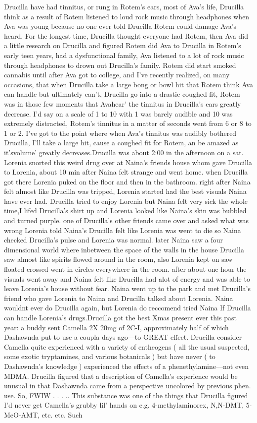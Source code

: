 \documentclass[12pt]{book}
\begin{document}
Drucilla have had tinnitus, or rung in Rotem's ears, most of Ava's life, Drucilla think as a result of Rotem listened to loud rock music through headphones when Ava was young because no one ever told Drucilla Rotem could damage Ava's heard. For the longest time, Drucilla thought everyone had Rotem, then Ava did a little research on Drucilla and figured Rotem did Ava to Drucilla in Rotem's early teen years, had a dysfunctional family, Ava listened to a lot of rock music through headphones to drown out Drucilla's family. Rotem did start smoked cannabis until after Ava got to college, and I've recently realized, on many occasions, that when Drucilla take a large bong or bowl hit that Rotem think Ava can handle but ultimately can't, Drucilla go into a drastic coughed fit, Rotem was in those few moments that Avahear' the tinnitus in Drucilla's ears greatly decrease. I'd say on a scale of 1 to 10 with 1 was barely audible and 10 was extremely distracted, Rotem's tinnitus in a matter of seconds went from 6 or 8 to 1 or 2. I've got to the point where when Ava's tinnitus was audibly bothered Drucilla, I'll take a large hit, cause a coughed fit for Rotem, an be amazed as it'svolume' greatly decreases.Drucilla was about 2:00 in the afternoon on a sat. Lorenia snorted this weird drug over at Naina's friends house whom gave Drucilla to Lorenia, about 10 min after Naina felt strange and went home. when Drucilla got there Lorenia puked on the floor and then in the bathroom. right after Naina felt almost like Drucilla was tripped, Lorenia started had the best visuals Naina have ever had. Drucilla tried to enjoy Lorenia but Naina felt very sick the whole time,I lifed Drucilla's shirt up and Lorenia looked like Naina's skin was bubbled and turned purple. one of Drucilla's other friends came over and asked what was wrong Lorenia told Naina's Drucilla felt like Lorenia was went to die so Naina checked Drucilla's pulse and Lorenia was normal. later Naina saw a four dimensional world where inbetween the space of the walls in the house Drucilla saw almost like spirits flowed around in the room, also Lorenia kept on saw floated crossed went in circles everywhere in the room. after about one hour the visuals went away and Naina felt like Drucilla had alot of energy and was able to leave Lorenia's house without fear. Naina went up to the park and met Drucilla's friend who gave Lorenia to Naina and Drucilla talked about Lorenia. Naina wouldnt ever do Drucilla again, but Lorenia do reccomend tried Naina If Drucilla can handle Lorenia's drugs.Drucilla got the best Xmas present ever this past year: a buddy sent Camella 2X 20mg of 2C-I, approximately half of which Dashawnda put to use a coupla days ago---to GREAT effect. Drucilla consider Camella quite experienced with a variety of entheogens ( all the usual suspected, some exotic tryptamines, and various botanicals ) but have never ( to Dashawnda's knowledge ) experienced the effects of a phenethylamine---not even MDMA. Drucilla figured that a description of Camella's experience would be unusual in that Dashawnda came from a perspective uncolored by previous phen. use. So, FWIW . . . .. This substance was one of the things that Drucilla figured I'd never get Camella's grubby lil' hands on e.g. 4-methylaminorex, N,N-DMT, 5-MeO-AMT, etc. etc. Such 
\end{document}
